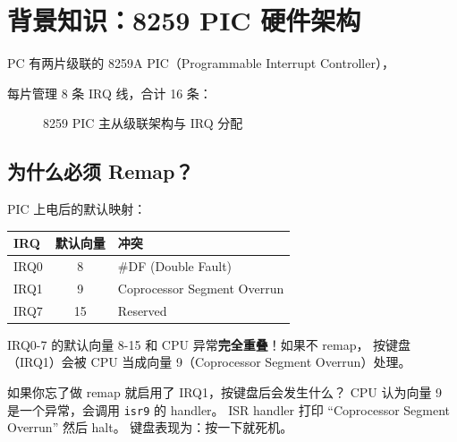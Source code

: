 \section{背景知识：8259 PIC 硬件架构}

PC 有两片级联的 8259A PIC（Programmable Interrupt Controller），

每片管理 8 条 IRQ 线，合计 16 条：

\begin{figure}[H]
  \centering
  
  \caption{8259 PIC 主从级联架构与 IRQ 分配}
\end{figure}

\subsection{为什么必须 Remap？}

PIC 上电后的默认映射：

\begin{longtable}{lcl}
  \toprule
  \textbf{IRQ} & \textbf{默认向量} & \textbf{冲突} \\
  \midrule
  IRQ0 & 8  & \#DF (Double Fault) \\
  IRQ1 & 9  & Coprocessor Segment Overrun \\
  IRQ7 & 15 & Reserved \\
  \bottomrule
\end{longtable}

IRQ0-7 的默认向量 8-15 和 CPU 异常\textbf{完全重叠}！如果不 remap，
按键盘（IRQ1）会被 CPU 当成向量 9（Coprocessor Segment Overrun）处理。

\begin{thinkbox}
如果你忘了做 remap 就启用了 IRQ1，按键盘后会发生什么？
CPU 认为向量 9 是一个异常，会调用 \texttt{isr9} 的 handler。
ISR handler 打印 ``Coprocessor Segment Overrun'' 然后 halt。
键盘表现为：按一下就死机。
\end{thinkbox}


